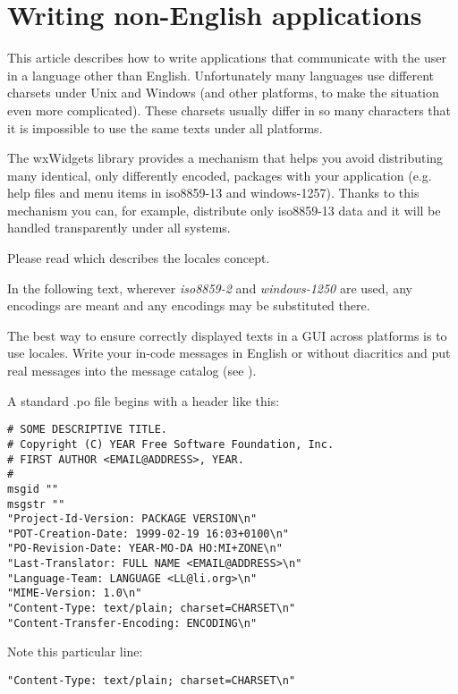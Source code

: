 \section{Writing non-English applications}\label{nonenglishoverview}

This article describes how to write applications that communicate with
the user in a language other than English. Unfortunately many languages use
different charsets under Unix and Windows (and other platforms, to make
the situation even more complicated). These charsets usually differ in so
many characters that it is impossible to use the same texts under all
platforms.

The wxWidgets library provides a mechanism that helps you avoid distributing many
identical, only differently encoded, packages with your application 
(e.g. help files and menu items in iso8859-13 and windows-1257). Thanks
to this mechanism you can, for example, distribute only iso8859-13 data 
and it will be handled transparently under all systems.

Please read  which
describes the locales concept.

In the following text, wherever {\it iso8859-2} and {\it windows-1250} are
used, any encodings are meant and any encodings may be substituted there.


The best way to ensure correctly displayed texts in a GUI across platforms
is to use locales. Write your in-code messages in English or without 
diacritics and put real messages into the message catalog (see 
).

A standard .po file begins with a header like this:

\begin{verbatim}
# SOME DESCRIPTIVE TITLE.
# Copyright (C) YEAR Free Software Foundation, Inc.
# FIRST AUTHOR <EMAIL@ADDRESS>, YEAR.
#
msgid ""
msgstr ""
"Project-Id-Version: PACKAGE VERSION\n"
"POT-Creation-Date: 1999-02-19 16:03+0100\n"
"PO-Revision-Date: YEAR-MO-DA HO:MI+ZONE\n"
"Last-Translator: FULL NAME <EMAIL@ADDRESS>\n"
"Language-Team: LANGUAGE <LL@li.org>\n"
"MIME-Version: 1.0\n"
"Content-Type: text/plain; charset=CHARSET\n"
"Content-Transfer-Encoding: ENCODING\n"
\end{verbatim}

Note this particular line:

\begin{verbatim}
"Content-Type: text/plain; charset=CHARSET\n"
\end{verbatim}

